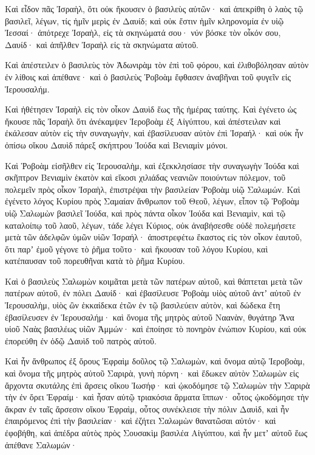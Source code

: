{Καὶ εἶδον πᾶς Ἰσραὴλ, ὅτι οὐκ ἤκουσεν ὁ βασιλεὺς αὐτῶν· καὶ ἀπεκρίθη ὁ λαὸς τῷ βασιλεῖ, λέγων, τίς ἡμῖν μερὶς ἐν Δαυίδ; καὶ οὐκ ἔστιν ἡμῖν κληρονομία ἐν υἱῷ Ἰεσσαί· ἀπότρεχε Ἰσραὴλ, εἰς τὰ σκηνώματά σου· νύν βόσκε τὸν οἶκόν σου, Δαυίδ· καὶ ἀπῆλθεν Ἰσραὴλ εἰς τὰ σκηνώματα αὐτοῦ.
\par }{\PP {}Καὶ ἀπέστειλεν ὁ βασιλεὺς τὸν Ἀδωνιρὰμ τὸν ἐπὶ τοῦ φόρου, καὶ ἐλιθοβόλησαν αὐτὸν ἐν λίθοις καὶ ἀπέθανε· καὶ ὁ βασιλεὺς Ῥοβοὰμ ἔφθασεν ἀναβῆναι τοῦ φυγεῖν εἰς Ἱερουσαλήμ.
\par }{\PP {}Καὶ ἠθέτησεν Ἰσραὴλ εἰς τὸν οἶκον Δαυὶδ ἕως τῆς ἡμέρας ταύτης.
Καὶ ἐγένετο ὡς ἤκουσε πᾶς Ἰσραὴλ ὅτι ἀνέκαμψεν Ἱεροβοὰμ ἐξ Αἰγύπτου, καὶ ἀπέστειλαν καὶ ἐκάλεσαν αὐτὸν εἰς τὴν συναγωγὴν, καὶ ἐβασίλευσαν αὐτὸν ἐπὶ Ἰσραήλ· καὶ οὐκ ἦν ὀπίσω οἴκου Δαυὶδ πάρεξ σκήπτρου Ἰούδα καὶ Βενιαμὶν μόνοι.
\par }{\PP {}Καὶ Ῥοβοὰμ εἰσῆλθεν εἰς Ἱερουσαλὴμ, καὶ ἐξεκκλησίασε τὴν συναγωγὴν Ἰούδα καὶ σκῆπτρον Βενιαμὶν ἑκατὸν καὶ εἴκοσι χιλιάδας νεανιῶν ποιούντων πόλεμον, τοῦ πολεμεῖν πρὸς οἶκον Ἰσραὴλ, ἐπιστρέψαι τὴν βασιλείαν Ῥοβοὰμ υἱῷ Σαλωμών.
Καὶ ἐγένετο λόγος Κυρίου πρὸς Σαμαίαν ἄνθρωπον τοῦ Θεοῦ, λέγων,
εἶπον τῷ Ῥοβοὰμ υἱῷ Σαλωμὼν βασιλεῖ Ἰούδα, καὶ πρὸς πάντα οἶκον Ἰούδα καὶ Βενιαμὶν, καὶ τῷ καταλοίπῳ τοῦ λαοῦ, λέγων,
τάδε λέγει Κύριος, οὐκ ἀναβήσεσθε οὐδὲ πολεμήσετε μετὰ τῶν ἀδελφῶν ὑμῶν υἱῶν Ἰσραήλ· ἀποστρεφέτω ἕκαστος εἰς τὸν οἶκον ἑαυτοῦ, ὅτι παρʼ ἐμοῦ γέγονε τὸ ῥῆμα τοῦτο· καὶ ἤκουσαν τοῦ λόγου Κυρίου, καὶ κατέπαυσαν τοῦ πορευθῆναι κατὰ τὸ ῥῆμα Κυρίου.
\par }{\PP {}Καὶ ὁ βασιλεὺς Σαλωμὼν κοιμᾶται μετὰ τῶν πατέρων αὐτοῦ, καὶ θάπτεται μετὰ τῶν πατέρων αὐτοῦ, ἐν πόλει Δαυίδ· καὶ ἐβασίλευσε Ῥοβοὰμ υἱὸς αὐτοῦ ἀντʼ αὐτοῦ ἐν Ἱερουσαλὴμ, υἱὸς ὢν ἑκκαίδεκα ἐτῶν ἐν τῷ βασιλεύειν αὐτὸν, καὶ δώδεκα ἔτη ἐβασίλευσεν ἐν Ἱερουσαλήμ· καὶ ὄνομα τῆς μητρὸς αὐτοῦ Ναανὰν, θυγάτηρ Ἄνα υἱοῦ Ναὰς βασιλέως υἱῶν Ἀμμών· καὶ ἐποίησε τὸ πονηρὸν ἐνώπιον Κυρίου, καὶ οὐκ ἐπορεύθη ἐν ὁδῷ Δαυὶδ τοῦ πατρὸς αὐτοῦ.
\par }{\PP {}Καὶ ἦν ἄνθρωπος ἐξ ὄρους Ἐφραὶμ δοῦλος τῷ Σαλωμὼν, καὶ ὄνομα αὐτῷ Ἱεροβοὰμ, καὶ ὄνομα τῆς μητρὸς αὐτοῦ Σαριρὰ, γυνὴ πόρνη· καὶ ἔδωκεν αὐτὸν Σαλωμὼν εἰς ἄρχοντα σκυτάλης ἐπὶ ἄρσεις οἴκου Ἰωσήφ· καὶ ᾠκοδόμησε τῷ Σαλωμὼν τὴν Σαριρὰ τὴν ἐν ὄρει Ἐφραίμ· καὶ ἦσαν αὐτῷ τριακόσια ἅρματα ἵππων· οὗτος ᾠκοδόμησε τὴν ἄκραν ἐν ταῖς ἄρσεσιν οἴκου Ἐφραὶμ, οὗτος συνέκλεισε τὴν πόλιν Δαυὶδ, καὶ ἦν ἐπαιρόμενος ἐπὶ τὴν βασιλείαν·
καὶ ἐζήτει Σαλωμὼν θανατῶσαι αὐτόν· καὶ ἐφοβήθη, καὶ ἀπέδρα αὐτὸς πρὸς Σουσακὶμ βασιλέα Αἰγύπτου, καὶ ἦν μετʼ αὐτοῦ ἕως ἀπέθανε Σαλωμών·
}
